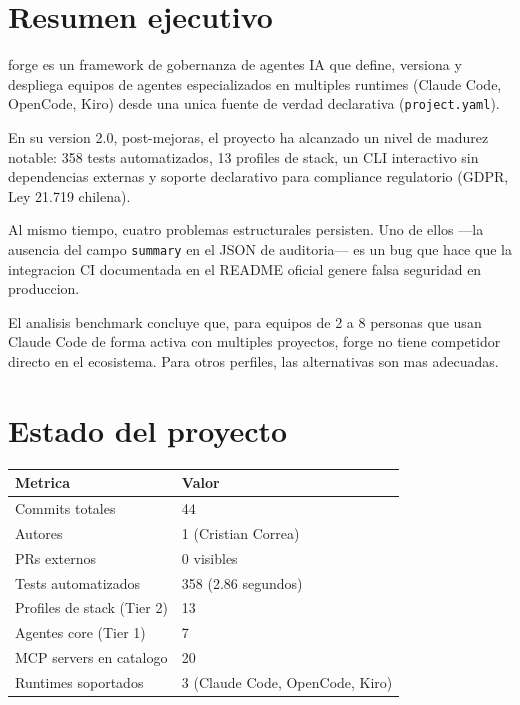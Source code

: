 \documentclass[12pt,a4paper]{article}
\begin{document}
\tableofcontents
\newpage

\section{Resumen ejecutivo}

forge es un framework de gobernanza de agentes IA que define, versiona y despliega
equipos de agentes especializados en multiples runtimes (Claude Code, OpenCode, Kiro)
desde una unica fuente de verdad declarativa (\texttt{project.yaml}).

En su version 2.0, post-mejoras, el proyecto ha alcanzado un nivel de madurez notable:
358 tests automatizados, 13 profiles de stack, un CLI interactivo sin dependencias
externas y soporte declarativo para compliance regulatorio (GDPR, Ley 21.719 chilena).

Al mismo tiempo, cuatro problemas estructurales persisten. Uno de ellos ---la ausencia
del campo \texttt{summary} en el JSON de auditoria--- es un bug que hace que la integracion
CI documentada en el README oficial genere falsa seguridad en produccion.

El analisis benchmark concluye que, para equipos de 2 a 8 personas que usan Claude Code
de forma activa con multiples proyectos, forge no tiene competidor directo en el ecosistema.
Para otros perfiles, las alternativas son mas adecuadas.

\section{Estado del proyecto}

\begin{center}
\begin{tabular}{ll}
  \toprule
  \textbf{Metrica} & \textbf{Valor} \\
  \midrule
  Commits totales & 44 \\
  Autores & 1 (Cristian Correa) \\
  PRs externos & 0 visibles \\
  Tests automatizados & 358 (2.86 segundos) \\
  Profiles de stack (Tier 2) & 13 \\
  Agentes core (Tier 1) & 7 \\
  MCP servers en catalogo & 20 \\
  Runtimes soportados & 3 (Claude Code, OpenCode, Kiro) \\
  \bottomrule
\end{tabular}
\end{center}
\end{document}
